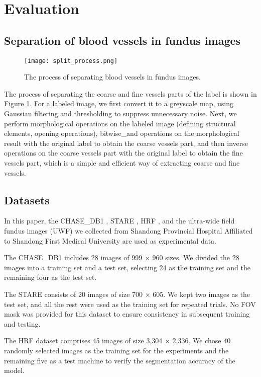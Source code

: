 \documentclass[a4paper,fleqn]{cas-dc}
\begin{document}
\section{Evaluation}
\subsection{Separation of blood vessels in fundus images}\label{split_chapter}

\begin{figure}[ht!]
	\centering\texttt{[image: split\_process.png]}
	\caption{The process of separating blood vessels in fundus images.}
	\label{split}
\end{figure}

The process of separating the coarse and fine vessels parts of the label is shown in Figure \ref{split}. For a labeled image, we first convert it to a greyscale map, using Gaussian filtering and thresholding to suppress unnecessary noise. Next, we perform morphological operations on the labeled image (defining structural elements, opening operations), bitwise\_and operations on the morphological result with the original label to obtain the coarse vessels part, and then inverse operations on the coarse vessels part with the original label to obtain the fine vessels part, which is a simple and efficient way of extracting coarse and fine vessels.

\subsection{Datasets}
In this paper, the CHASE\_DB1 \cite{Owen2009MeasuringRV}, STARE \cite{Hoover2000LocatingBV}, HRF \cite{Odstrcilk2013RetinalVS}, and the ultra-wide field fundus images (UWF) we collected from Shandong Provincial Hospital Affiliated to Shandong First Medical University are used as experimental data. 

The CHASE\_DB1 includes 28 images of 999 $\times$ 960 sizes. We divided the 28 images into a training set and a test set, selecting 24 as the training set and the remaining four as the test set.

The STARE consists of 20 images of size 700 $\times$ 605. We kept two images as the test set, and all the rest were used as the training set for repeated trials. No FOV mask was provided for this dataset to ensure consistency in subsequent training and testing.

The HRF dataset comprises 45 images of size 3,304 $\times$ 2,336. We chose 40 randomly selected images as the training set for the experiments and the remaining five as a test machine to verify the segmentation accuracy of the model.
\end{document}
